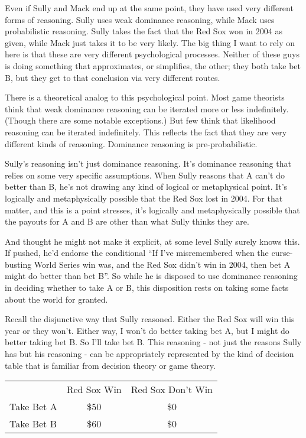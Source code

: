 \documentclass[11pt,]{book}
\def\toprule{}
\def\bottomrule{}
\begin{document}
Even if Sully and Mack end up at the same point, they have used very different forms of reasoning. Sully uses weak dominance reasoning, while Mack uses probabilistic reasoning. Sully takes the fact that the Red Sox won in 2004 as given, while Mack just takes it to be very likely. The big thing I want to rely on here is that these are very different psychological processes. Neither of these guys is doing something that approximates, or simplifies, the other; they both take bet B, but they get to that conclusion via very different routes.

There is a theoretical analog to this psychological point. Most game theorists think that weak dominance reasoning can be iterated more or less indefinitely. (Though there are some notable exceptions.) But few think that likelihood reasoning can be iterated indefinitely. This reflects the fact that they are very different kinds of reasoning. Dominance reasoning is pre-probabilistic.

Sully's reasoning isn't just dominance reasoning. It's dominance reasoning that relies on some very specific assumptions. When Sully reasons that A can't do better than B, he's not drawing any kind of logical or metaphysical point. It's logically and metaphysically possible that the Red Sox lost in 2004. For that matter, and this is a point \citet{Ganson2019} stresses, it's logically and metaphysically possible that the payouts for A and B are other than what Sully thinks they are.

And thought he might not make it explicit, at some level Sully surely knows this. If pushed, he'd endorse the conditional ``If I've misremembered when the curse-busting World Series win was, and the Red Sox didn't win in 2004, then bet A might do better than bet B''. So while he is disposed to use dominance reasoning in deciding whether to take A or B, this disposition rests on taking some facts about the world for granted.

Recall the disjunctive way that Sully reasoned. Either the Red Sox will win this year or they won't. Either way, I won't do better taking bet A, but I might do better taking bet B. So I'll take bet B. This reasoning - not just the reasons Sully has but his reasoning - can be appropriately represented by the kind of decision table that is familiar from decision theory or game theory.

\begin{longtable}[]{@{}lcc@{}}
\toprule
\endhead
& Red Sox Win & Red Sox Don't Win\tabularnewline
Take Bet A & \$50 & \$0\tabularnewline
Take Bet B & \$60 & \$0\tabularnewline
\bottomrule
\end{longtable}
\end{document}
